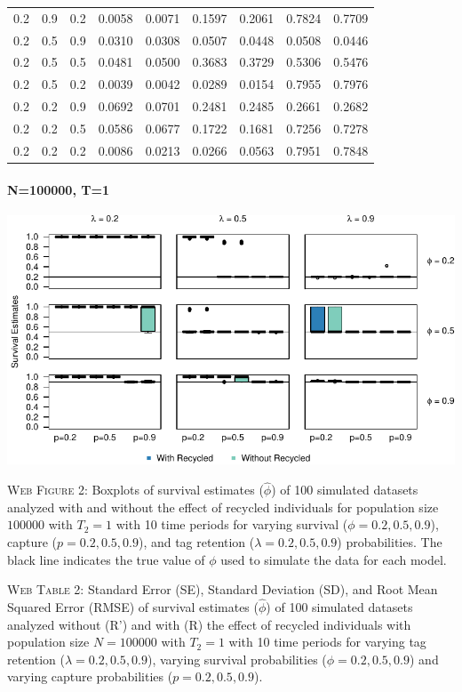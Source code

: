\documentclass[]{article}
\let\oldparagraph\paragraph
\renewcommand{\paragraph}[1]{\oldparagraph{#1}\mbox{}}
\begin{document}
\begin{table}[ht]
{\begin{tabular}{rrrrrrrrr}
  0.2 & 0.9 & 0.2 & 0.0058 & 0.0071 & 0.1597 & 0.2061 & 0.7824 & 0.7709 \\ 
  0.2 & 0.5 & 0.9 & 0.0310 & 0.0308 & 0.0507 & 0.0448 & 0.0508 & 0.0446 \\ 
  0.2 & 0.5 & 0.5 & 0.0481 & 0.0500 & 0.3683 & 0.3729 & 0.5306 & 0.5476 \\ 
  0.2 & 0.5 & 0.2 & 0.0039 & 0.0042 & 0.0289 & 0.0154 & 0.7955 & 0.7976 \\ 
  0.2 & 0.2 & 0.9 & 0.0692 & 0.0701 & 0.2481 & 0.2485 & 0.2661 & 0.2682 \\ 
  0.2 & 0.2 & 0.5 & 0.0586 & 0.0677 & 0.1722 & 0.1681 & 0.7256 & 0.7278 \\ 
  0.2 & 0.2 & 0.2 & 0.0086 & 0.0213 & 0.0266 & 0.0563 & 0.7951 & 0.7848 \\ 
   \hline
\end{tabular}
}
\endgroup
\end{table}

\newpage 

\paragraph{N=100000, T=1}\label{n100000-t1}

\includegraphics{Appendix_files/figure-latex/figure2_survival_GJSTL2-1.pdf}

\textsc{Web Figure 2:} Boxplots of survival estimates (\(\hat{\phi}\))
of 100 simulated datasets analyzed with and without the effect of
recycled individuals for population size \(100000\) with \(T_2=1\) with
10 time periods for varying survival (\(\phi=0.2,0.5,0.9\)), capture
(\(p=0.2,0.5,0.9\)), and tag retention (\(\lambda=0.2,0.5,0.9\))
probabilities. The black line indicates the true value of \(\phi\) used
to simulate the data for each model.

\textsc{Web Table 2:} Standard Error (SE), Standard Deviation (SD), and
Root Mean Squared Error (RMSE) of survival estimates (\(\hat{\phi}\)) of
100 simulated datasets analyzed without (R') and with (R) the effect of
recycled individuals with population size \(N=100000\) with \(T_2=1\)
with 10 time periods for varying tag retention
(\(\lambda=0.2,0.5,0.9\)), varying survival probabilities
(\(\phi=0.2,0.5,0.9\)) and varying capture probabilities
(\(p=0.2,0.5,0.9\)).
\end{document}
